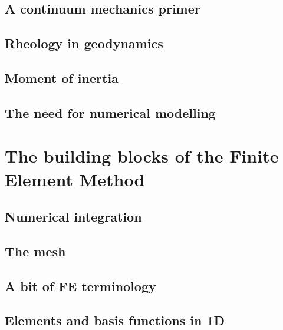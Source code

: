 \documentclass[a4paper]{article}
\begin{document}
\subsection{A continuum mechanics primer} %
\subsection{Rheology in geodynamics}  %
\subsection{Moment of inertia} 
\subsection{The need for numerical modelling}

\newpage
\section{The building blocks of the Finite Element Method} %
\subsection{Numerical integration} \label{sec:quadrature} %
\subsection{The mesh}
\subsection{A bit of FE terminology}  %
\subsection{Elements and basis functions in 1D}\label{sec:elts1D}  %
\end{document}
